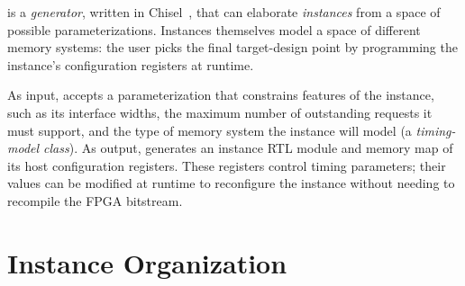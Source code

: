 \PNAME is a \textit{generator}, written in Chisel~\cite{Chisel}, that can
elaborate \textit{instances} from a space of possible parameterizations.
Instances themselves model a space of different memory systems: the user picks the
final target-design point by programming the instance's configuration registers
at runtime.

As input, \PNAME accepts a parameterization that constrains features
of the instance, such as its interface widths, the maximum number of
outstanding requests it must support, and the type of memory system the
instance will model (a \emph{timing-model class}). As output, \PNAME generates
an instance RTL module and memory map of its host configuration registers. These
registers control timing parameters; their values can be modified at runtime
to reconfigure the instance without needing to recompile the FPGA bitstream.

\section{Instance Organization}

